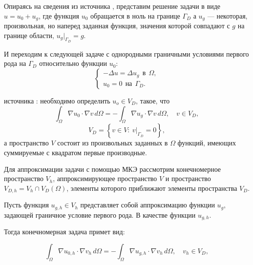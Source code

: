 \documentclass[12pt, a4paper]{article}
\begin{document}
			Опираясь на сведения из источника \cite{Galanin}, представим решение задачи в виде $u = u_0 + u_g$, где функция $u_0$ обращается в ноль на границе $\Gamma_D$ а $u_g$ --- некоторая, произвольная, но наперед заданная функция, значения которой совпадают с $g$ на границе области, $u_g |_{\Gamma_D} = g$.
			
			И переходим к следующей задаче с однородными граничными условиями первого рода на $\Gamma_D$ относительно функции $u_0$:
			\begin{equation*}
			\begin{cases}
				- \Delta u  = \Delta u_g \ \  \text{в}\ \  \Omega, \\
				u_0 = 0 \ \ \text{на}\ \  \Gamma_D.
			\end{cases}			
			\end{equation*}
			
			 источника \cite{Galanin}: необходимо определить $u_o \in V_D$, такое, что 
			\begin{equation*}
				\int_{\Omega} \nabla u_0 \cdot \nabla v \, d\Omega = 
				- \int_{\Omega} \nabla u_g \cdot \nabla v \, d\Omega, \quad v \in V_D,
			\end{equation*}			
			\begin{equation*}
				V_D = \left\{ v \in V: \ v |_{\Gamma_D} = 0 \right\},
			\end{equation*}
			а пространство $V$ состоит из произвольных заданных в $\Omega$ функций, имеющих суммируемые с квадратом первые производные.
			
			Для аппроксимации задачи с помощью МКЭ рассмотрим конечномерное пространство $V_h$, аппроксимирующее пространство $V$ и пространство 
			$V_{D,h} = V_h \cap V_D(\Omega)$, элементы которого приближают элементы пространства $V_D$. 
			
			Пусть функция $u_{g,h} \in V_h $ представляет собой аппроксимацию функции $u_g$, задающей граничное условие первого рода. В качестве функции $u_{g,h}$. 
			
			Тогда конечномерная задача примет вид: 
			
			\begin{equation*}
				\int_{\Omega} \nabla u_{0,h} \cdot \nabla v_{h} \, d\Omega = 
				- \int_{\Omega} \nabla u_{g,h} \cdot \nabla v_{h} \, d\Omega, \quad v_{h} \in V_D,
			\end{equation*}
			
\end{document}
